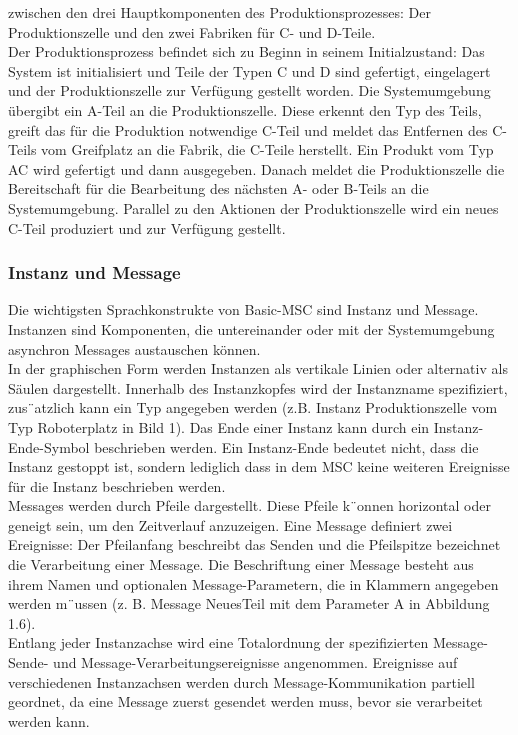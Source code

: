 zwischen den drei Hauptkomponenten
des Produktionsprozesses: Der Produktionszelle und den
zwei Fabriken für C- und D-Teile.
\\
Der Produktionsprozess befindet sich zu Beginn in seinem
Initialzustand: Das System ist initialisiert und Teile
der Typen C und D sind gefertigt, eingelagert und der
Produktionszelle zur Verfügung gestellt worden. Die Systemumgebung
übergibt ein A-Teil an die Produktionszelle.
Diese erkennt den Typ des Teils, greift das für die Produktion
notwendige C-Teil und meldet das Entfernen des
C-Teils vom Greifplatz an die Fabrik, die C-Teile herstellt.
Ein Produkt vom Typ AC wird gefertigt und dann
ausgegeben. Danach meldet die Produktionszelle die Bereitschaft
für die Bearbeitung des nächsten A- oder B-Teils
an die Systemumgebung. Parallel zu den Aktionen der Produktionszelle
wird ein neues C-Teil produziert und zur
Verfügung gestellt.\\
\subsubsection{Instanz und Message}
Die wichtigsten Sprachkonstrukte von Basic-MSC sind Instanz
und Message. Instanzen sind Komponenten, die untereinander
oder mit der Systemumgebung asynchron Messages
austauschen können.\\
In der graphischen Form werden Instanzen als vertikale
Linien oder alternativ als Säulen dargestellt. Innerhalb
des Instanzkopfes wird der Instanzname spezifiziert,
zus¨atzlich kann ein Typ angegeben werden (z.B. Instanz
Produktionszelle vom Typ Roboterplatz in
Bild 1). Das Ende einer Instanz kann durch ein Instanz-
Ende-Symbol beschrieben werden. Ein Instanz-Ende
bedeutet nicht, dass die Instanz gestoppt ist, sondern lediglich
dass in dem MSC keine weiteren Ereignisse für die
Instanz beschrieben werden.\\
Messages werden durch Pfeile dargestellt. Diese Pfeile
k¨onnen horizontal oder geneigt sein, um den Zeitverlauf
anzuzeigen. Eine Message definiert zwei Ereignisse: Der
Pfeilanfang beschreibt das Senden und die Pfeilspitze bezeichnet
die Verarbeitung einer Message. Die Beschriftung
einer Message besteht aus ihrem Namen und optionalen
Message-Parametern, die in Klammern angegeben werden
m¨ussen (z. B. Message NeuesTeil mit dem Parameter A
in Abbildung 1.6).\\
Entlang jeder Instanzachse wird eine Totalordnung der spezifizierten
Message-Sende- und Message-Verarbeitungsereignisse
angenommen. Ereignisse auf verschiedenen Instanzachsen
werden durch Message-Kommunikation partiell
geordnet, da eine Message zuerst gesendet werden muss,
bevor sie verarbeitet werden kann.
